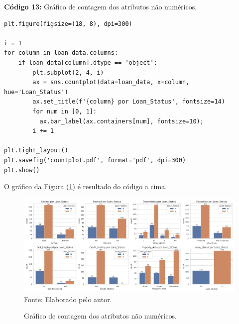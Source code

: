 \documentclass[a4paper,12pt]{article} %
\begin{document}
\begin{center}
\textbf{Código 13:} Gráfico de contagem dos atributos não numéricos.
\begin{verbatim}
plt.figure(figsize=(18, 8), dpi=300)

i = 1
for column in loan_data.columns:
    if loan_data[column].dtype == 'object':
        plt.subplot(2, 4, i)
        ax = sns.countplot(data=loan_data, x=column, hue='Loan_Status')
        ax.set_title(f'{column} por Loan_Status', fontsize=14)
        for num in [0, 1]:
          ax.bar_label(ax.containers[num], fontsize=10);
        i += 1

plt.tight_layout()
plt.savefig('countplot.pdf', format='pdf', dpi=300)
plt.show()
\end{verbatim}
\end{center}

O gráfico da Figura (\ref{fig:3}) é resultado do código a cima.

\begin{figure}[H]
    \centering
    \caption{Gráfico de contagem dos atributos não numéricos.}
    \includegraphics[scale=0.35]{Figures/countplot.pdf} \\
    Fonte: Elaborado pelo autor.
    \label{fig:3}
\end{figure}
\end{document}
